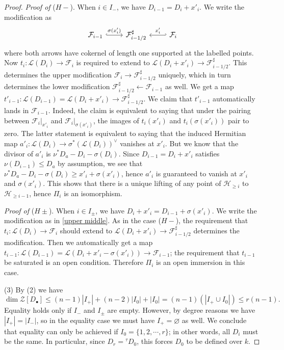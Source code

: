 \documentclass[reqno]{amsart}
\numberwithin{equation}{section}
\newcommand{\ft}{{}^{\tau}}
\newcommand{\bu}{\bullet}
\newcommand\vn{\varnothing}
\newcommand{\s}{\sigma}
\newcommand\sh{\sharp}
\newcommand\cF{\mathcal{F}}
\newcommand\cH{\mathcal{H}}
\newcommand\cL{\mathcal{L}}
\newcommand\cZ{\mathcal{Z}}
\theoremstyle{remark}
\numberwithin{equation}{section}
\begin{document}
\begin{proof}
\emph{Proof of} ($H-$). When $i\in I_{-}$, we have $D_{i-1}=D_{i}+x'_{i}$. We write the modification as 
\begin{equation}\label{upper middle}
\begin{tikzcd}
\cF_{i-1}\ar[r, "\s(x'_{i})", hook] & \cF^{\sh}_{i-1/2} & \cF_{i}\ar[l, "x'_{i}"', hook' ]
\end{tikzcd} 
\end{equation}
where both arrows have cokernel of length one supported at the labelled points. Now $t_{i}: \cL(D_{i})\to \cF_{i}$ is required to extend to $\cL(D_{i}+x'_{i})\to \cF^{\sh}_{i-1/2}$. This determines the upper modification $\cF_{i}\to \cF^{\sh}_{i-1/2}$ uniquely, which in turn determines the lower modification $\cF^{\sh}_{i-1/2}\leftarrow \cF_{i-1}$ as well. We get a map $t'_{i-1}: \cL(D_{i-1})=\cL(D_{i}+x'_{i})\to \cF^{\sh}_{i-1/2}$. We claim that $t'_{i-1}$ automatically lands in $\cF_{i-1}$. Indeed, the claim is equivalent to saying that under the pairing between $\cF_{i}|_{x'_{i}}$ and $\cF_{i}|_{\s(x'_{i})}$, the images of $t_{i}(x'_{i})$ and $t_{i}(\s(x'_{i}))$ pair to zero. The latter statement is equivalent to saying that the induced Hermitian map $a'_{i}: \cL(D_{i})\to \s^{*}(\cL(D_{i}))^{\vee}$ vanishes at $x'_{i}$. But we know that the divisor of $a'_{i}$ is $\nu^{*}D_{a}-D_{i}-\s(D_{i})$. Since $D_{i-1}=D_{i}+x'_{i}$ satisfies $\nu(D_{i-1})\le D_{a}$ by assumption, we see that $\nu^{*}D_{a}-D_{i}-\s(D_{i})\ge x'_{i}+\s(x'_{i})$, hence $a'_{i}$ is guaranteed to vanish at $x'_{i}$ and $\s(x'_{i})$. This shows that there is a unique lifting of any point of $\cH_{\ge i}$ to $\cH_{\ge i-1}$, hence $\Pi_{i}$ is an isomorphism.  

\emph{Proof of} ($H\pm$). When $i\in I_{\pm}$, we have $D_{i}+x'_{i}=D_{i-1}+\s(x'_{i})$. We write the modification as in \eqref{upper middle}. As in the case ($H-$), the requirement that $t_{i}: \cL(D_{i})\to \cF_{i}$ should extend to $\cL(D_{i}+x'_{i})\to \cF^{\sh}_{i-1/2}$ determines the modification. Then we automatically get a map $t_{i-1}: \cL(D_{i-1})=\cL(D_{i}+x'_{i}-\s(x'_{i}))\to \cF_{i-1}$; the requirement that $t_{i-1}$ be saturated is an open condition. Therefore $\Pi_{i}$ is an open immersion in this case.

(3) By (2) we have 
\[
\dim \cZ[D_{\bu}]\le (n-1)|I_{+}|+(n-2)|I_{0}|+|I_{0}|=(n-1)(|I_{+}\cup I_{0}|)\le r(n-1).
\]
Equality holds only if $I_{-}$ and $I_{\pm}$ are empty. However, by degree reasons we have $|I_{+}|=|I_{-}|$, so in the equality case we must have $I_{+}=\vn$ as well. We conclude that equality can only be achieved if $I_{0}=\{1,2,\cdots, r\}$; in other words, all $D_{i}$ must be the same. In particular, since $D_r = \ft D_0$, this forces $D_0$ to be defined over $k$. 
\end{proof}
\end{document}
